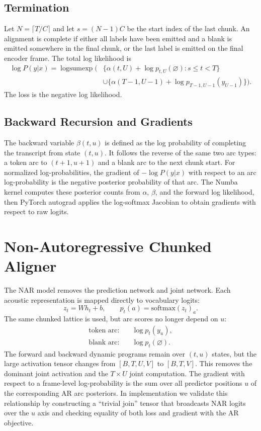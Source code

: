 \documentclass[conference]{IEEEtran}
\newcommand{\blank}{\varnothing}
\newcommand{\logsumexp}{\operatorname{logsumexp}}
\begin{document}
\subsection{Termination}

Let $N=\lceil T/C\rceil$ and let $s=(N-1)C$ be the start index of the last chunk.
An alignment is complete if either all labels have been emitted and a blank is
emitted somewhere in the final chunk, or the last label is emitted on the final
encoder frame. The total log likelihood is
\begin{align}
  \log P(y|x) = \logsumexp \Big(
  &\{\alpha(t,U) + \log p_{t,U}(\blank) : s \le t < T\} \nonumber\\
  &\cup \{\alpha(T-1,U-1) + \log p_{T-1,U-1}(y_{U-1})\}
  \Big).
\end{align}
The loss is the negative log likelihood.

\subsection{Backward Recursion and Gradients}

The backward variable $\beta(t,u)$ is defined as the log probability of
completing the transcript from state $(t,u)$. It follows the reverse of the same
two arc types: a token arc to $(t+1,u+1)$ and a blank arc to the next chunk start.
For normalized log-probabilities, the gradient of $-\log P(y|x)$ with respect to
an arc log-probability is the negative posterior probability of that arc. The
Numba kernel computes these posterior counts from $\alpha$, $\beta$, and the
forward log likelihood, then PyTorch autograd applies the log-softmax Jacobian to
obtain gradients with respect to raw logits.

\section{Non-Autoregressive Chunked Aligner}

The NAR model removes the prediction network and joint network. Each acoustic
representation is mapped directly to vocabulary logits:
\begin{equation}
  z_t = W h_t + b, \qquad
  p_t(a) = \mathrm{softmax}(z_t)_a.
\end{equation}
The same chunked lattice is used, but arc scores no longer depend on $u$:
\begin{align}
  \text{token arc:}\quad & \log p_{t}(y_u),\\
  \text{blank arc:}\quad & \log p_{t}(\blank).
\end{align}
The forward and backward dynamic programs remain over $(t,u)$ states, but the
large activation tensor changes from $[B,T,U,V]$ to $[B,T,V]$. This removes the
dominant joint activation and the $T \times U$ joint computation. The gradient
with respect to a frame-level log-probability is the sum over all predictor
positions $u$ of the corresponding AR arc posteriors. In implementation we
validate this relationship by constructing a ``trivial join'' tensor that
broadcasts NAR logits over the $u$ axis and checking equality of both loss and
gradient with the AR objective.
\end{document}

